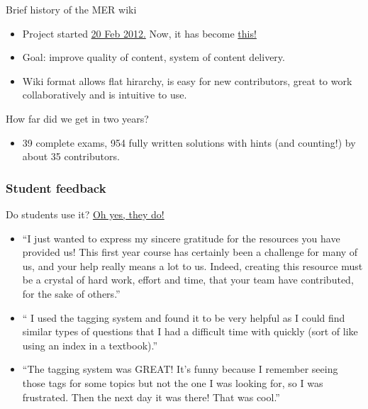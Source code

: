 \documentclass{beamer}
\begin{document}
\frame
{
  \begin{block}{Brief history of the MER wiki}

      \begin{itemize}
				\item Project started \href{http://wiki.ubc.ca/index.php?title=Science:Math_Exam_Resources&oldid=139951}{20 Feb 2012.} Now, it has become \href{http://wiki.ubc.ca/Science:Math_Exam_Resources}{this!}

                \item Goal: improve quality of content, system of content delivery.

				\item Wiki format allows flat hirarchy, is easy for new contributors, great to work collaboratively and is intuitive to use.
      \end{itemize}
    \end{block}

    \begin{block}{How far did we get in two years?}
        \begin{itemize}
            \item 39 complete exams, 954 fully written solutions with hints (and counting!) by about 35 contributors.

         \end{itemize}
      \end{block}
}

\frame
{
    \frametitle{Student feedback}
Do students use it? \href{http://htmlpreview.github.io/?https://github.com/MER-wiki/google-analytics/blob/master/presentations/2014-02-13_Lunch_Series/output-hidden.html}{Oh yes, they do!}

\begin{itemize}
\item ``I just wanted to express my sincere gratitude for the resources you have provided us! This first year course has certainly been a challenge for many of us, and your help really means a lot to us. Indeed, creating this resource must be a crystal of hard work, effort
and time, that your team have contributed, for the sake of others.''
\item `` I used the tagging system and found it to be very helpful as I could find similar types of questions that I had a difficult time with quickly (sort of like using an index in a textbook).''
\item ``The tagging system was GREAT! It's funny because I remember seeing those tags for some topics but not the one I was looking for, so I was frustrated. Then the next day it was there! That was cool.''
\end{itemize}

}
\end{document}
